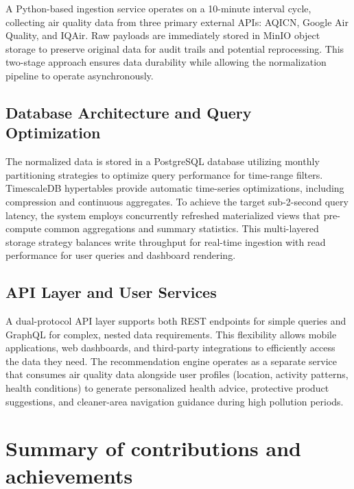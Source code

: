 A Python-based ingestion service operates on a 10-minute interval cycle, collecting air quality data from three primary external APIs: AQICN, Google Air Quality, and IQAir. Raw payloads are immediately stored in MinIO object storage to preserve original data for audit trails and potential reprocessing. This two-stage approach ensures data durability while allowing the normalization pipeline to operate asynchronously.

\subsection{Database Architecture and Query Optimization}
\label{sec:intro_database}

The normalized data is stored in a PostgreSQL database utilizing monthly partitioning strategies to optimize query performance for time-range filters. TimescaleDB hypertables provide automatic time-series optimizations, including compression and continuous aggregates. To achieve the target sub-2-second query latency, the system employs concurrently refreshed materialized views that pre-compute common aggregations and summary statistics. This multi-layered storage strategy balances write throughput for real-time ingestion with read performance for user queries and dashboard rendering.

\subsection{API Layer and User Services}
\label{sec:intro_api}

A dual-protocol API layer supports both REST endpoints for simple queries and GraphQL for complex, nested data requirements. This flexibility allows mobile applications, web dashboards, and third-party integrations to efficiently access the data they need. The recommendation engine operates as a separate service that consumes air quality data alongside user profiles (location, activity patterns, health conditions) to generate personalized health advice, protective product suggestions, and cleaner-area navigation guidance during high pollution periods.


\section{Summary of contributions and achievements}
\label{sec:intro_sum_results}

